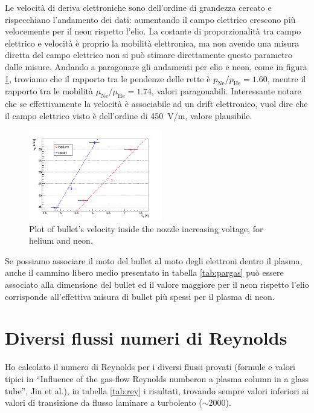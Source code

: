 \documentclass[oneside,11pt,a4paper,italian]{article}
\begin{document}
Le velocità di deriva elettroniche sono dell'ordine di grandezza cercato e rispecchiano l'andamento dei dati: aumentando il campo elettrico crescono più velocemente per il neon rispetto l'elio. La costante di proporzionalità tra campo elettrico e velocità è proprio la mobilità elettronica, ma non avendo una misura diretta del campo elettrico non si può stimare direttamente questo parametro dalle misure. Andando a paragonare gli andamenti per elio e neon, come in figura \ref{fig:andmob}, troviamo che il rapporto tra le pendenze delle rette è $p_{\text{Ne}}/p_{\text{He}} = \num{1.60}$, mentre il rapporto tra le mobilità $\mu_{\text{Ne}}/\mu_{\text{He}} = \num{1.74}$, valori paragonabili. Interessante notare che se effettivamente la velocità è associabile ad un drift elettronico, vuol dire che il campo elettrico visto è dell'ordine di \SI{450}{\volt/\meter}, valore plausibile. 
\begin{figure}
 \centering
 \includegraphics[width=0.52\textwidth]{../Images/Shape/hene_vN.png}
 \caption{Plot of bullet's velocity inside the nozzle increasing voltage, for helium and neon.}
 \label{fig:andmob}
\end{figure}


Se possiamo associare il moto del bullet al moto degli elettroni dentro il plasma, anche il cammino libero medio presentato in tabella \ref{tab:pargas} può essere associato alla dimensione del bullet ed il valore maggiore per il neon rispetto l'elio corrisponde all'effettiva misura di bullet più spessi per il plasma di neon.


\section{Diversi flussi numeri di Reynolds}
Ho calcolato il numero di Reynolds per i diversi flussi provati (formule e valori tipici in ``Influence of the gas-flow Reynolds numberon a plasma column in a glass tube'', Jin et al.), in tabella \ref{tab:rey} i risultati, trovando sempre valori inferiori ai valori di transizione da flusso laminare a turbolento ($\sim 2000$).
\end{document}
